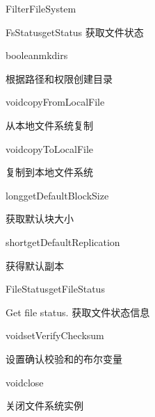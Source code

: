 \begin{XeClass}{FilterFileSystem}
\begin{XeMethod}{\XePublic}{FsStatus}{getStatus}
 获取文件状态

    \end{XeMethod}

    \begin{XeMethod}{\XePublic}{boolean}{mkdirs}
         
 根据路径和权限创建目录

    \end{XeMethod}

    \begin{XeMethod}{\XePublic}{void}{copyFromLocalFile}
         
 从本地文件系统复制

    \end{XeMethod}

    \begin{XeMethod}{\XePublic}{void}{copyToLocalFile}
         
 复制到本地文件系统

    \end{XeMethod}

    \begin{XeMethod}{\XePublic}{long}{getDefaultBlockSize}
         
 获取默认块大小

    \end{XeMethod}

    \begin{XeMethod}{\XePublic}{short}{getDefaultReplication}
         
 获得默认副本

    \end{XeMethod}

    \begin{XeMethod}{\XePublic}{FileStatus}{getFileStatus}
         
 Get file status.
 获取文件状态信息

    \end{XeMethod}

    \begin{XeMethod}{\XePublic}{void}{setVerifyChecksum}
         
 设置确认校验和的布尔变量

    \end{XeMethod}

    \begin{XeMethod}{\XePublic}{void}{close}
         
 关闭文件系统实例

    \end{XeMethod}


\end{XeClass}
